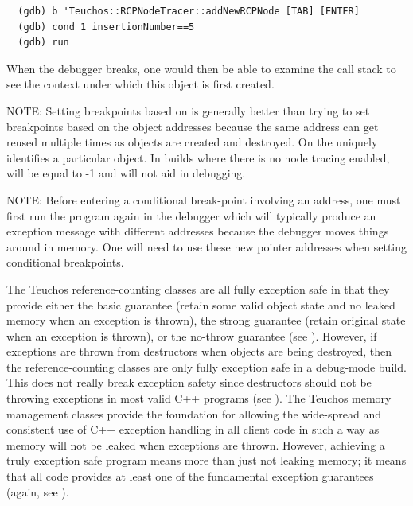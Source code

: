 \documentclass[pdf,ps2pdf,11pt]{SANDreport}
\begin{document}
{\small\begin{verbatim}
  (gdb) b 'Teuchos::RCPNodeTracer::addNewRCPNode [TAB] [ENTER]
  (gdb) cond 1 insertionNumber==5
  (gdb) run
\end{verbatim}}

When the debugger breaks, one would then be able to examine the call
stack to see the context under which this {} object is
first created.

NOTE: Setting breakpoints based on {} is
generally better than trying to set breakpoints based on the object
addresses because the same address can get reused multiple times as
objects are created and destroyed.  On the {}
uniquely identifies a particular {} object.  In builds
where there is no node tracing enabled, {} will
be equal to -1 and will not aid in debugging.

NOTE: Before entering a conditional break-point involving an address,
one must first run the program again in the debugger which will
typically produce an exception message with different addresses
because the debugger moves things around in memory.  One will need to
use these new pointer addresses when setting conditional breakpoints.

The Teuchos reference-counting classes are all fully exception safe in
that they provide either the basic guarantee (retain some valid object
state and no leaked memory when an exception is thrown), the strong
guarantee (retain original state when an exception is thrown), or the
no-throw guarantee (see {}\cite[Item 71]{C++CodingStandards05}).
However, if exceptions are thrown from destructors when objects are
being destroyed, then the reference-counting classes are only fully
exception safe in a debug-mode build.  This does not really break
exception safety since destructors should not be throwing exceptions
in most valid C++ programs (see {}\cite[Item
51]{C++CodingStandards05}).  The Teuchos memory management classes
provide the foundation for allowing the wide-spread and consistent use
of C++ exception handling in all client code in such a way as memory
will not be leaked when exceptions are thrown.  However, achieving a
truly exception safe program means more than just not leaking memory;
it means that all code provides at least one of the fundamental
exception guarantees (again, see {}\cite[Item
71]{C++CodingStandards05}).
\end{document}
